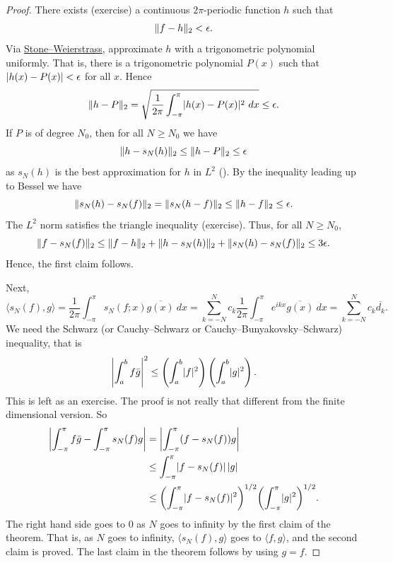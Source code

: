 \begin{proof}
There exists (exercise)
a continuous $2\pi$-periodic function $h$ such that
\begin{equation*}
\lVert {f-h} \rVert_2 < \epsilon .
\end{equation*}
Via \hyperref[thm:SWcomplex]{Stone--Weierstrass},
approximate $h$ with a trigonometric polynomial
uniformly.  That is, there is a trigonometric polynomial $P(x)$
such that
$\lvert {h(x) - P(x)} \rvert < \epsilon$ for all $x$.
Hence
\begin{equation*}
\lVert {h-P} \rVert_2
=
\sqrt{
\frac{1}{2\pi}
\int_{-\pi}^{\pi}
\lvert {h(x)-P(x)} \rvert^2
~
dx
}
\leq \epsilon.
\end{equation*}
If $P$ is of degree $N_0$, then for all $N \geq N_0$ we have
\begin{equation*}
\lVert {h-s_N(h)} \rVert_2 \leq \lVert {h-P} \rVert_2 \leq \epsilon
\end{equation*}
as $s_N(h)$ is the best approximation for $h$ in $L^2$ ().
By the inequality leading up to Bessel we have
\begin{equation*}
\lVert {s_N(h)-s_N(f)} \rVert_2
=
\lVert {s_N(h-f)} \rVert_2
\leq
\lVert {h-f} \rVert_2 \leq \epsilon .
\end{equation*}
The $L^2$ norm satisfies the triangle inequality (exercise).
Thus, for all $N \geq N_0$,
\begin{equation*}
\lVert {f-s_N(f)} \rVert_2
\leq
\lVert {f-h} \rVert_2
+
\lVert {h-s_N(h)} \rVert_2
+
\lVert {s_N(h)-s_N(f)} \rVert_2
\leq 3\epsilon .
\end{equation*}
Hence, the first claim follows.

Next,
\begin{equation*}
\langle s_N(f) , g \rangle
=
\frac{1}{2\pi}
\int_{-\pi}^\pi
s_N(f;x) \overline{g(x)} ~ dx
=
\sum_{k=-N}^N
c_k 
\frac{1}{2\pi}
\int_{-\pi}^\pi
e^{ikx}
\overline{g(x)} ~ dx
=
\sum_{k=-N}^N
c_k 
\overline{d_k} .
\end{equation*}
We need the Schwarz (or Cauchy--Schwarz or Cauchy--Bunyakovsky--Schwarz)
inequality, that is
\begin{equation*}
{\left\lvert {\int_a^b f\bar{g}} \right\rvert}^2
\leq
\left( \int_a^b \lvert {f} \rvert^2 \right)
\left( \int_a^b \lvert {g} \rvert^2 \right) .
\end{equation*}
This is left as an exercise.  The proof is not really that
different from the finite dimensional version.
So
\begin{equation*}
\begin{split}
\left\lvert {\int_{-\pi}^\pi f\bar{g} - \int_{-\pi}^\pi s_N(f)g} \right\rvert
& =
\left\lvert {\int_{-\pi}^\pi (f- s_N(f))g} \right\rvert \\
& \leq
\int_{-\pi}^\pi \lvert {f- s_N(f)} \rvert\, \lvert {g} \rvert \\
& \leq
{\left(\int_{-\pi}^\pi \lvert {f- s_N(f)} \rvert^2 \right)}^{1/2}
{\left( \int_{-\pi}^\pi \lvert {g} \rvert^2 \right)}^{1/2} .
\end{split}
\end{equation*}
The right hand side goes to 0 as $N$ goes to infinity by the first
claim of the theorem.
That is, as $N$ goes to infinity, $\langle s_N(f),g \rangle$
goes to $\langle f,g \rangle$, and
the second claim is proved.  The last claim in the theorem follows by using
$g=f$.
\end{proof}

